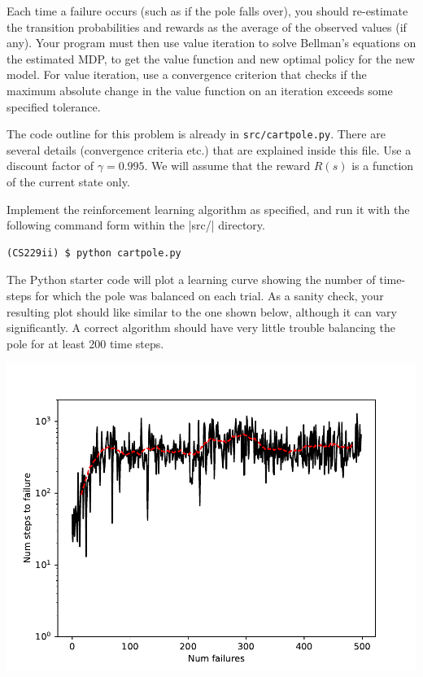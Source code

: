 Each time a failure occurs (such as if the pole falls over), you should 
re-estimate the transition probabilities and rewards as the average of 
the observed values (if any).  Your program must then use value iteration 
to solve Bellman's equations on the estimated MDP, to get the value function 
and new optimal policy for the new model.  For value iteration, use a 
convergence criterion that checks if the maximum absolute change in the 
value function on an iteration exceeds some specified tolerance. 

The code outline for this problem is already in 
{\tt src/cartpole.py}. There are several details (convergence criteria
etc.) that are explained inside this file. Use a discount factor
of $\gamma = 0.995$.  We will assume that the reward $R(s)$ is a function of
the current state only.

Implement the reinforcement learning algorithm as specified, and run it with the
following command form within the |src/| directory.
\begin{lstlisting}
(CS229ii) $ python cartpole.py
\end{lstlisting}

The Python starter code will plot a learning curve showing the number of
time-steps for which the pole was balanced on each trial. As a sanity check,
your resulting plot should like similar to the one shown below, although it can
vary significantly.  A correct algorithm should have very little trouble
balancing the pole for at least 200 time steps.

\begin{center}
  \includegraphics[scale=0.75]{cartpole/control}
\end{center}
